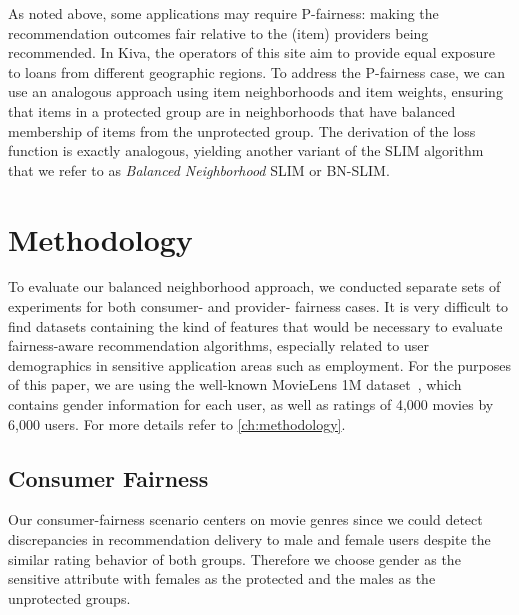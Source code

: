 As noted above, some applications may require P-fairness: making the recommendation outcomes fair relative to the (item) providers being recommended.  In Kiva, the operators of this site aim to provide equal exposure to loans from different geographic regions. To address the P-fairness case, we can use an analogous approach using item neighborhoods and item weights, ensuring that items in a protected group are in neighborhoods that have balanced membership of items from the unprotected group. The derivation of the loss function is exactly analogous, yielding another variant of the SLIM algorithm that we refer to as \textit{Balanced Neighborhood} SLIM or BN-SLIM.

\section{Methodology}

To evaluate our balanced neighborhood approach, we conducted separate sets of experiments for both consumer- and provider- fairness cases. It is very difficult to find datasets containing the kind of features that would be necessary to evaluate fairness-aware recommendation algorithms, especially related to user demographics in sensitive application areas such as employment. For the purposes of this paper, we are using the well-known MovieLens 1M dataset~\cite{movielens}, which contains gender information for each user, as well as ratings of 4,000 movies by 6,000 users. For more details refer to \ref{ch:methodology}.


\subsection{Consumer Fairness}

Our consumer-fairness scenario centers on movie genres since we could detect discrepancies in recommendation delivery to male and female users despite the similar rating behavior of both groups. Therefore we choose gender as the sensitive attribute with females as the protected and the males as the unprotected groups.

